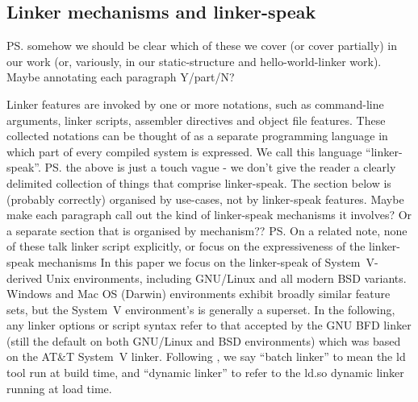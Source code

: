 \subsection{Linker mechanisms and linker-speak}

\ps{somehow we should be clear which of these we cover (or cover
  partially) in our work (or, variously, in our static-structure and
  hello-world-linker work). Maybe annotating each paragraph Y/part/N?}

Linker features are invoked by one or more notations, 
such as command-line arguments, linker scripts, assembler directives and 
object file features.
These collected notations can be thought of as a separate programming language
in which part of every compiled system is expressed.
We call this language ``linker-speak''.
\ps{the above is just a touch vague - we don't give the reader a
  clearly delimited collection of things that comprise
  linker-speak. The section below is (probably correctly) organised by
  use-cases, not by linker-speak features.  Maybe make each paragraph
  call out the kind of linker-speak mechanisms it involves?  Or a
  separate section that is organised by mechanism??}
\ps{On a related note, none of these talk linker script explicitly, or
  focus on the expressiveness of the linker-speak mechanisms}
In this paper we focus on the linker-speak of System~V-derived Unix environments,
including GNU/Linux and all modern BSD variants.
Windows and Mac OS (Darwin) environments exhibit broadly similar feature sets,
but the System~V environment's is generally a superset.
In the following, any linker options or script syntax
refer to that accepted by the GNU BFD linker (still the 
default on both GNU/Linux and BSD environments)
which was based on the AT\&T System~V linker.
Following \citet{gingell_1987_shared}, we say ``batch linker''
to mean the \textsf{ld} tool run at build time, and 
``dynamic linker'' to refer to the \textsf{ld.so} dynamic linker running
at load time.



% 

